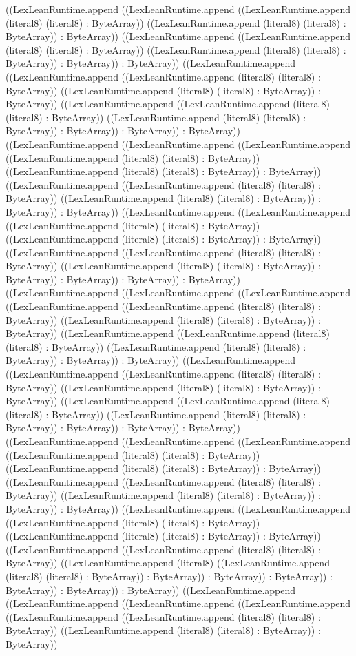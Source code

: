 \documentclass[11pt]{article}
\begin{document}
((LexLeanRuntime.append ((LexLeanRuntime.append ((LexLeanRuntime.append (literal8) (literal8) : ByteArray)) ((LexLeanRuntime.append (literal8) (literal8) : ByteArray)) : ByteArray)) ((LexLeanRuntime.append ((LexLeanRuntime.append (literal8) (literal8) : ByteArray)) ((LexLeanRuntime.append (literal8) (literal8) : ByteArray)) : ByteArray)) : ByteArray)) ((LexLeanRuntime.append ((LexLeanRuntime.append ((LexLeanRuntime.append (literal8) (literal8) : ByteArray)) ((LexLeanRuntime.append (literal8) (literal8) : ByteArray)) : ByteArray)) ((LexLeanRuntime.append ((LexLeanRuntime.append (literal8) (literal8) : ByteArray)) ((LexLeanRuntime.append (literal8) (literal8) : ByteArray)) : ByteArray)) : ByteArray)) : ByteArray)) ((LexLeanRuntime.append ((LexLeanRuntime.append ((LexLeanRuntime.append ((LexLeanRuntime.append (literal8) (literal8) : ByteArray)) ((LexLeanRuntime.append (literal8) (literal8) : ByteArray)) : ByteArray)) ((LexLeanRuntime.append ((LexLeanRuntime.append (literal8) (literal8) : ByteArray)) ((LexLeanRuntime.append (literal8) (literal8) : ByteArray)) : ByteArray)) : ByteArray)) ((LexLeanRuntime.append ((LexLeanRuntime.append ((LexLeanRuntime.append (literal8) (literal8) : ByteArray)) ((LexLeanRuntime.append (literal8) (literal8) : ByteArray)) : ByteArray)) ((LexLeanRuntime.append ((LexLeanRuntime.append (literal8) (literal8) : ByteArray)) ((LexLeanRuntime.append (literal8) (literal8) : ByteArray)) : ByteArray)) : ByteArray)) : ByteArray)) : ByteArray)) ((LexLeanRuntime.append ((LexLeanRuntime.append ((LexLeanRuntime.append ((LexLeanRuntime.append ((LexLeanRuntime.append (literal8) (literal8) : ByteArray)) ((LexLeanRuntime.append (literal8) (literal8) : ByteArray)) : ByteArray)) ((LexLeanRuntime.append ((LexLeanRuntime.append (literal8) (literal8) : ByteArray)) ((LexLeanRuntime.append (literal8) (literal8) : ByteArray)) : ByteArray)) : ByteArray)) ((LexLeanRuntime.append ((LexLeanRuntime.append ((LexLeanRuntime.append (literal8) (literal8) : ByteArray)) ((LexLeanRuntime.append (literal8) (literal8) : ByteArray)) : ByteArray)) ((LexLeanRuntime.append ((LexLeanRuntime.append (literal8) (literal8) : ByteArray)) ((LexLeanRuntime.append (literal8) (literal8) : ByteArray)) : ByteArray)) : ByteArray)) : ByteArray)) ((LexLeanRuntime.append ((LexLeanRuntime.append ((LexLeanRuntime.append ((LexLeanRuntime.append (literal8) (literal8) : ByteArray)) ((LexLeanRuntime.append (literal8) (literal8) : ByteArray)) : ByteArray)) ((LexLeanRuntime.append ((LexLeanRuntime.append (literal8) (literal8) : ByteArray)) ((LexLeanRuntime.append (literal8) (literal8) : ByteArray)) : ByteArray)) : ByteArray)) ((LexLeanRuntime.append ((LexLeanRuntime.append ((LexLeanRuntime.append (literal8) (literal8) : ByteArray)) ((LexLeanRuntime.append (literal8) (literal8) : ByteArray)) : ByteArray)) ((LexLeanRuntime.append ((LexLeanRuntime.append (literal8) (literal8) : ByteArray)) ((LexLeanRuntime.append (literal8) ((LexLeanRuntime.append (literal8) (literal8) : ByteArray)) : ByteArray)) : ByteArray)) : ByteArray)) : ByteArray)) : ByteArray)) : ByteArray)) ((LexLeanRuntime.append ((LexLeanRuntime.append ((LexLeanRuntime.append ((LexLeanRuntime.append ((LexLeanRuntime.append ((LexLeanRuntime.append (literal8) (literal8) : ByteArray)) ((LexLeanRuntime.append (literal8) (literal8) : ByteArray)) : ByteArray)) 
\end{document}
